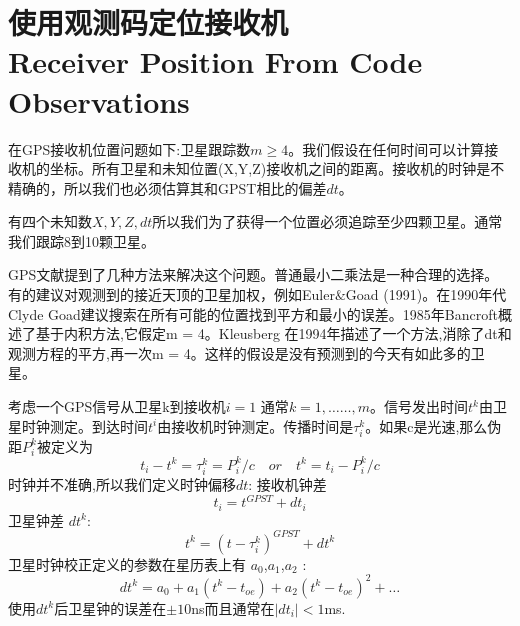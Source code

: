 \section[使用观测码定位接收机]{使用观测码定位接收机\\Receiver Position From Code Observations}
	在GPS接收机位置问题如下:卫星跟踪数$m\geq4$。我们假设在任何时间可以计算接收机的坐标。所有卫星和未知位置(X,Y,Z)接收机之间的距离。接收机的时钟是不精确的，所以我们也必须估算其和GPST相比的偏差$dt$。
	
	有四个未知数$X,Y,Z,dt$所以我们为了获得一个位置必须追踪至少四颗卫星。通常我们跟踪8到10颗卫星。
	
	GPS文献提到了几种方法来解决这个问题。普通最小二乘法是一种合理的选择。有的建议对观测到的接近天顶的卫星加权，例如Euler$\&$Goad (1991)。在1990年代Clyde Goad建议搜索在所有可能的位置找到平方和最小的误差。1985年Bancroft概述了基于内积方法,它假定m = 4。Kleusberg 在1994年描述了一个方法,消除了dt和观测方程的平方,再一次m = 4。这样的假设是没有预测到的今天有如此多的卫星。
		
	
	考虑一个GPS信号从卫星k到接收机$i = 1$ 通常$k = 1,……,m$。信号发出时间$t^k$由卫星时钟测定。到达时间$t^i$由接收机时钟测定。传播时间是$\tau^k_i$。如果c是光速,那么伪距$P^k_i$被定义为
	\begin{equation}\label{eq:9.13}
	t_i-t^k=\tau^k_i=P^k_i/c\quad or\quad t^k=t_i-P^k_i/c
	\end{equation}
	时钟并不准确,所以我们定义时钟偏移$dt$:
	接收机钟差
	\begin{equation}\label{9.14}
	t_i = t^{GPST}+dt_i
	\end{equation} 
	卫星钟差 $dt^k$:
	\begin{equation}\label{eq:9.15}
	t^k = (t-\tau ^k_i)^{GPST}+dt^k
	\end{equation}
	卫星时钟校正定义的参数在星历表上有 $a_0$,$a_1$,$a_2$ :
	\begin{equation}\label{eq:9.16}
	dt^k=a_0+a_1(t^k-t_{oe})+a_2(t^k-t_{oe})^2+\ldots
	\end{equation}
	使用$dt^k$后卫星钟的误差在$\pm 10$ns而且通常在$|dt_i|<1$ms.
	
